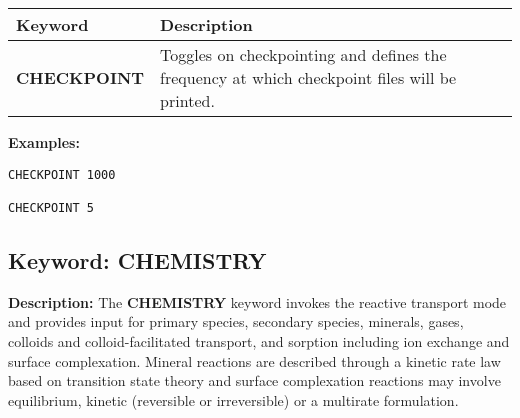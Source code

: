 \documentclass[12pt]{article}
\begin{document}
\begin{center}
\begin{tabularx}{\linewidth}{lX}
\toprule[1.5pt]
\bf Keyword & \bf Description\\
\midrule
\bf CHECKPOINT & Toggles on checkpointing and defines the frequency at which checkpoint files will be printed.\\
\bottomrule
\end{tabularx}
\end{center}

\bigskip

{\noindent\bf Examples:}
\begin{verbatim}
CHECKPOINT 1000

CHECKPOINT 5
\end{verbatim}

\newpage
\protect\hypertarget{target_chem}{}

\subsection{Keyword: CHEMISTRY}

\noindent
{\bf Description:}
The {\bf CHEMISTRY} keyword invokes the reactive transport mode and provides input for primary species, secondary species, minerals, gases, colloids and colloid-facilitated transport, and sorption including ion exchange and surface complexation. Mineral reactions are described through a kinetic rate law based on transition state theory and surface complexation reactions may involve equilibrium, kinetic (reversible or irreversible) or a multirate formulation.


\end{document}
